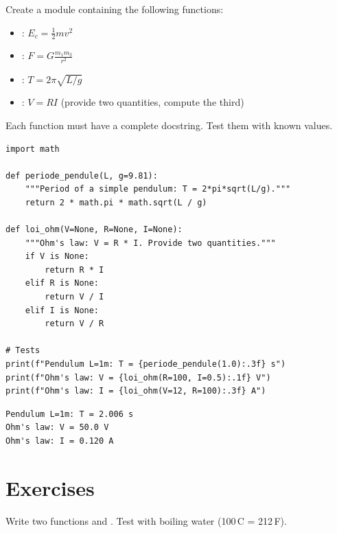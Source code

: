 \begin{projet}
Create a module containing the following functions:
\begin{itemize}
    \item {}: $E_c = \frac{1}{2}mv^2$
    \item {}: $F = G\frac{m_1 m_2}{r^2}$
    \item {}: $T = 2\pi\sqrt{L/g}$
    \item {}: $V = RI$ (provide two quantities, compute the third)
\end{itemize}
Each function must have a complete docstring. Test them with known values.
\end{projet}

\begin{codeblock}[title=\textbf{Python}]
\begin{verbatim}
import math

def periode_pendule(L, g=9.81):
    """Period of a simple pendulum: T = 2*pi*sqrt(L/g)."""
    return 2 * math.pi * math.sqrt(L / g)

def loi_ohm(V=None, R=None, I=None):
    """Ohm's law: V = R * I. Provide two quantities."""
    if V is None:
        return R * I
    elif R is None:
        return V / I
    elif I is None:
        return V / R

# Tests
print(f"Pendulum L=1m: T = {periode_pendule(1.0):.3f} s")
print(f"Ohm's law: V = {loi_ohm(R=100, I=0.5):.1f} V")
print(f"Ohm's law: I = {loi_ohm(V=12, R=100):.3f} A")
\end{verbatim}
\end{codeblock}

\begin{codeoutput}
\begin{verbatim}
Pendulum L=1m: T = 2.006 s
Ohm's law: V = 50.0 V
Ohm's law: I = 0.120 A
\end{verbatim}
\end{codeoutput}

\section{Exercises}

\begin{exercise}
Write two functions  and .
Test with boiling water (100\,\textdegree C = 212\,\textdegree F).
\end{exercise}

